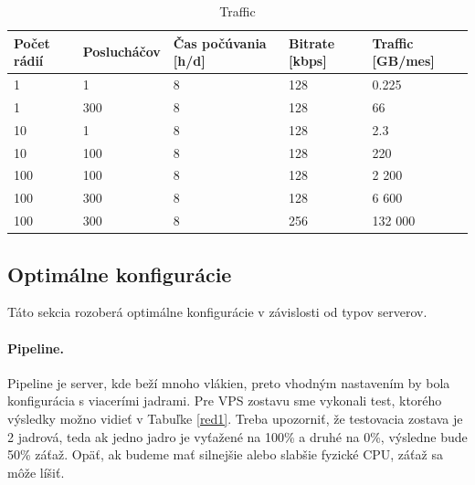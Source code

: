 \documentclass[11pt]{article}
\newif\ifknowhow
\newcommand{\ommited}{ VYNECHANÉ }
\begin{document}
\begin{table}[htp]
\centering
\begin{tabular}{|p{2cm}|p{2cm}|p{2.5cm}|p{2cm}|p{2cm}|}
\hline
	Počet rádií & Poslucháčov & Čas počúvania [h/d] & Bitrate [kbps] & Traffic [GB/mes]\\
\hline
	1 & 1 & 8 & 128 & 0.225\\
\hline
	1 & 300 & 8 & 128 & 66\\
\hline
	10 & 1 & 8 & 128 & 2.3\\
\hline
	10 & 100 & 8 & 128 & 220\\
\hline
	100 & 100 & 8 & 128 & 2 200\\
\hline
	100 & 300 & 8 & 128 & 6 600\\
\hline
	100 & 300 & 8 & 256 & 132 000\\
\hline
\end{tabular}

\caption{Traffic}
\label{tra}
\end{table}

\subsection{Optimálne konfigurácie \label{oh2}}

Táto sekcia rozoberá optimálne konfigurácie v závislosti od typov serverov. 

\paragraph{Pipeline.} Pipeline je server, kde beží mnoho \ifknowhow GStreamer\else\ommited{} \fi  vlákien, preto vhodným nastavením by bola konfigurácia s viacerími jadrami. Pre VPS zostavu sme vykonali test, ktorého výsledky možno vidieť v Tabuľke \ref{red1}. Treba upozorniť, že testovacia zostava je 2 jadrová, teda ak jedno jadro je vyťažené na 100\% a druhé na 0\%, výsledne bude 50\% záťaž. Opäť, ak budeme mať silnejšie alebo slabšie fyzické CPU, záťaž sa môže líšiť.
\end{document}
